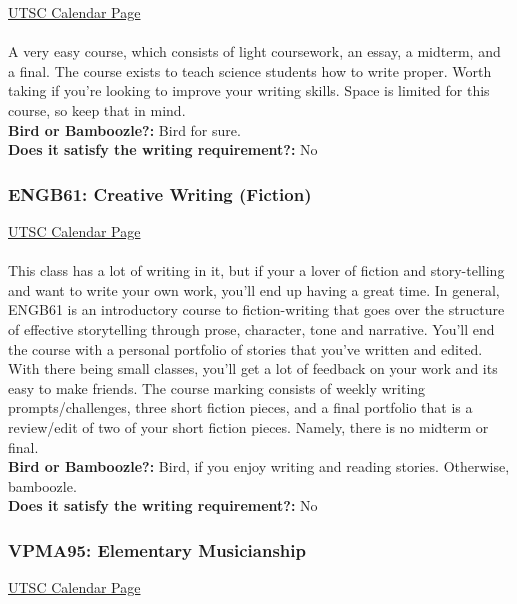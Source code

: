 \documentclass[11pt]{article}
\begin{document}
\href{https://utsc.calendar.utoronto.ca/course/engb02h3}{UTSC Calendar Page}\\\\

A very easy course, which consists of light coursework, an essay, a
midterm, and a final. The course exists to teach science students how
to write proper. Worth taking if you're looking to improve your writing
skills. Space is limited for this course, so keep that in mind.\\

\textbf{Bird or Bamboozle?:} Bird for sure.\\

\textbf{Does it satisfy the writing requirement?:} No

\subsubsection{ENGB61: Creative Writing (Fiction)}

\href{https://utsc.calendar.utoronto.ca/course/engb61h3}{UTSC Calendar Page}\\\\

This class has a lot of writing in it, but if your a lover of fiction
and story-telling and want to write your own work, you'll end up
having a great time. In general, ENGB61 is an introductory course to
fiction-writing that goes over the structure of effective storytelling
through prose, character, tone and narrative. You'll end the course with
a personal portfolio of stories that you've written and edited. With
there being small classes, you'll get a lot of feedback on your work and
its easy to make friends. The course marking consists of weekly writing
prompts/challenges, three short fiction pieces, and a final portfolio
that is a review/edit of two of your short fiction pieces. Namely, there
is no midterm or final. \\

\textbf{Bird or Bamboozle?:} Bird, if you enjoy writing and reading
stories. Otherwise, bamboozle.\\

\textbf{Does it satisfy the writing requirement?:} No

\subsubsection{VPMA95: Elementary Musicianship}

\href{https://utsc.calendar.utoronto.ca/course/VPMA95H3}{UTSC Calendar Page}\\\\
\end{document}

